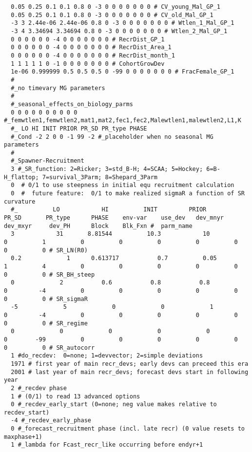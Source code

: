 \begin{landscape}
{\begin{verbatim}
  0.05 0.25 0.1 0.1 0.8 0 -3 0 0 0 0 0 0 0 # CV_young_Mal_GP_1
  0.05 0.25 0.1 0.1 0.8 0 -3 0 0 0 0 0 0 0 # CV_old_Mal_GP_1
  -3 3 2.44e-06 2.44e-06 0.8 0 -3 0 0 0 0 0 0 0 # Wtlen_1_Mal_GP_1
  -3 4 3.34694 3.34694 0.8 0 -3 0 0 0 0 0 0 0 # Wtlen_2_Mal_GP_1
  0 0 0 0 0 0 -4 0 0 0 0 0 0 0 # RecrDist_GP_1
  0 0 0 0 0 0 -4 0 0 0 0 0 0 0 # RecrDist_Area_1
  0 0 0 0 0 0 -4 0 0 0 0 0 0 0 # RecrDist_month_1
  1 1 1 1 1 0 -1 0 0 0 0 0 0 0 # CohortGrowDev
  1e-06 0.999999 0.5 0.5 0.5 0 -99 0 0 0 0 0 0 0 # FracFemale_GP_1
  #
  #_no timevary MG parameters
  #
  #_seasonal_effects_on_biology_parms
  0 0 0 0 0 0 0 0 0 0 #_femwtlen1,femwtlen2,mat1,mat2,fec1,fec2,Malewtlen1,malewtlen2,L1,K
  #_ LO HI INIT PRIOR PR_SD PR_type PHASE
  #_Cond -2 2 0 0 -1 99 -2 #_placeholder when no seasonal MG parameters
  #
  #_Spawner-Recruitment
  3 #_SR_function: 2=Ricker; 3=std_B-H; 4=SCAA; 5=Hockey; 6=B-H_flattop; 7=survival_3Parm; 8=Shepard_3Parm
  0  # 0/1 to use steepness in initial equ recruitment calculation
  0  #  future feature:  0/1 to make realized sigmaR a function of SR curvature
  #_          LO            HI          INIT         PRIOR         PR_SD       PR_type      PHASE    env-var    use_dev   dev_mnyr   dev_mxyr     dev_PH      Block    Blk_Fxn #  parm_name
  3            31       8.81544          10.3            10             0          1          0          0          0          0          0          0          0 # SR_LN(R0)
  0.2             1      0.613717           0.7          0.05             1          4          0          0          0          0          0          0          0 # SR_BH_steep
  0             2           0.6           0.8           0.8             0         -4          0          0          0          0          0          0          0 # SR_sigmaR
  -5             5             0             0             1             0         -4          0          0          0          0          0          0          0 # SR_regime
  0             0             0             0             0             0        -99          0          0          0          0          0          0          0 # SR_autocorr
  1 #do_recdev:  0=none; 1=devvector; 2=simple deviations
  1971 # first year of main recr_devs; early devs can preceed this era
  2001 # last year of main recr_devs; forecast devs start in following year
  2 #_recdev phase 
  1 # (0/1) to read 13 advanced options
  0 #_recdev_early_start (0=none; neg value makes relative to recdev_start)
  -4 #_recdev_early_phase
  0 #_forecast_recruitment phase (incl. late recr) (0 value resets to maxphase+1)
  1 #_lambda for Fcast_recr_like occurring before endyr+1

\end{verbatim}}
\end{landscape}
